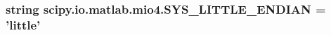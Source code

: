 \subsubsection[{S\+Y\+S\+\_\+\+L\+I\+T\+T\+L\+E\+\_\+\+E\+N\+D\+I\+A\+N}]{\setlength{\rightskip}{0pt plus 5cm}string scipy.\+io.\+matlab.\+mio4.\+S\+Y\+S\+\_\+\+L\+I\+T\+T\+L\+E\+\_\+\+E\+N\+D\+I\+A\+N = 'little'}\label{namespacescipy_1_1io_1_1matlab_1_1mio4_a5dbd8a10a7ff7916403613f047eee4ba}
